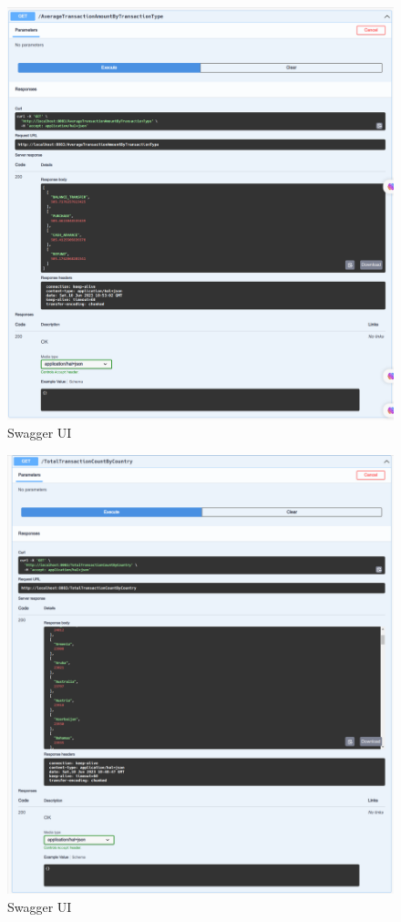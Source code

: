 \begin{figure}[H]
\centering
\includegraphics[width=\linewidth]{images/Swagger-UI-2.png}
\caption{Swagger UI}\label{fig:swagger-2}
\end{figure}

\begin{figure}[H]
\centering
\includegraphics[width=\linewidth]{images/Swagger-UI.png}
\caption{Swagger UI}\label{fig:swagger-3}
\end{figure}

